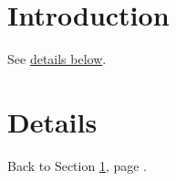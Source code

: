 \documentclass{article}
\begin{document}
\tableofcontents
\section{Introduction}\label{sec:intro}
See \hyperref[sec:details]{details below}.

\section{Details}\label{sec:details}
Back to Section \ref{sec:intro}, page \pageref{sec:intro}.
\end{document}
